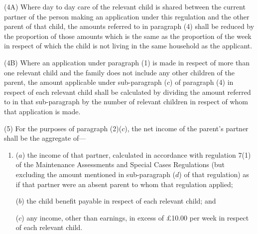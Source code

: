 \documentclass[12pt,a4paper]{article}
\begin{document}
(4A) Where day to day care of the relevant child is shared between the current partner of the person making an application under this regulation and the other parent of that child, the amounts referred to in paragraph (4) shall be reduced by the proportion of those amounts which is the same as the proportion of the week in respect of which the child is not living in the same household as the applicant.

(4B) Where an application under paragraph (1) is made in respect of more than one relevant child and the family does not include any other children of the parent, the amount applicable under sub-paragraph ($c$) of paragraph (4) in respect of each relevant child shall be calculated by dividing the amount referred to in that sub-paragraph by the number of relevant children in respect of whom that application is made.

(5) For the purposes of paragraph (2)($c$), the net income of the parent’s partner
shall be the aggregate of—
\begin{enumerate}\item[]
($a$) the income of that partner, calculated in accordance with regulation 7(1) of
the Maintenance Assessments and Special Cases Regulations (but excluding the
amount mentioned in sub-paragraph ($d$) of that regulation) as if that partner
were an absent parent to whom that regulation applied;

($b$) the child benefit payable in respect of each relevant child; and

($c$) any income, other than earnings, in excess of £10.00 per week in respect of
each relevant child.
\end{enumerate}
\end{document}
